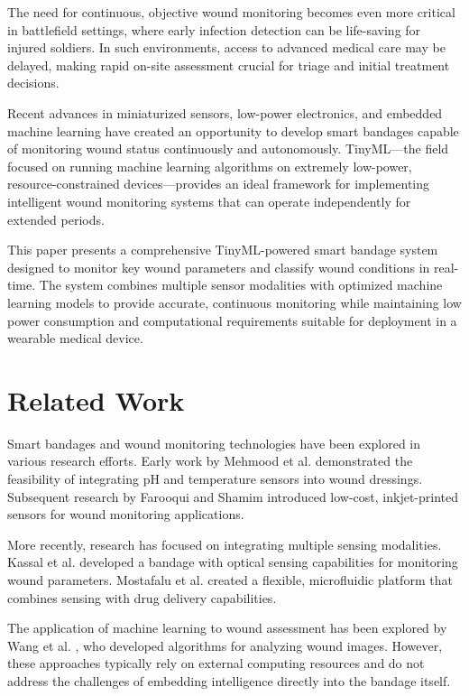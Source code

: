 \documentclass[conference]{IEEEtran}
\begin{document}
The need for continuous, objective wound monitoring becomes even more critical in battlefield settings, where early infection detection can be life-saving for injured soldiers. In such environments, access to advanced medical care may be delayed, making rapid on-site assessment crucial for triage and initial treatment decisions.

Recent advances in miniaturized sensors, low-power electronics, and embedded machine learning have created an opportunity to develop smart bandages capable of monitoring wound status continuously and autonomously. TinyML—the field focused on running machine learning algorithms on extremely low-power, resource-constrained devices—provides an ideal framework for implementing intelligent wound monitoring systems that can operate independently for extended periods.

This paper presents a comprehensive TinyML-powered smart bandage system designed to monitor key wound parameters and classify wound conditions in real-time. The system combines multiple sensor modalities with optimized machine learning models to provide accurate, continuous monitoring while maintaining low power consumption and computational requirements suitable for deployment in a wearable medical device.

\section{Related Work}
Smart bandages and wound monitoring technologies have been explored in various research efforts. Early work by Mehmood et al. \cite{mehmood2014smart} demonstrated the feasibility of integrating pH and temperature sensors into wound dressings. Subsequent research by Farooqui and Shamim \cite{farooqui2016low} introduced low-cost, inkjet-printed sensors for wound monitoring applications.

More recently, research has focused on integrating multiple sensing modalities. Kassal et al. \cite{kassal2015smart} developed a bandage with optical sensing capabilities for monitoring wound parameters. Mostafalu et al. \cite{mostafalu2018smart} created a flexible, microfluidic platform that combines sensing with drug delivery capabilities.

The application of machine learning to wound assessment has been explored by Wang et al. \cite{wang2020machine}, who developed algorithms for analyzing wound images. However, these approaches typically rely on external computing resources and do not address the challenges of embedding intelligence directly into the bandage itself.
\end{document}
